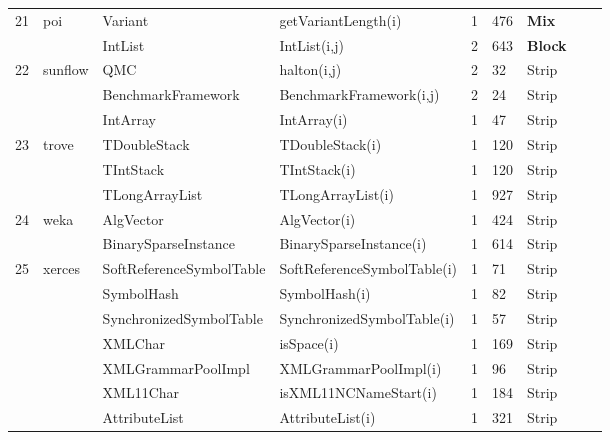 \begin{table}[h]
{\begin{tabular}{|l|l|l|l|l|l|l|l|l|}
21	&	poi			& Variant				& getVariantLength(i)		& 1			& 476	& {\bf Mix}  										\\ 
	&				& IntList					& IntList(i,j)				& 2			& 643	& {\bf Block} 										\\ 	
22	&	sunflow		& QMC					& halton(i,j)				& 2			& 32	& Strip  										\\ 
	&				& BenchmarkFramework	& BenchmarkFramework(i,j) & 2		& 24	& Strip   										\\ 
	&				& IntArray				& IntArray(i)				& 1			& 47	& Strip 										\\ 	
23	&	trove		& TDoubleStack			& TDoubleStack(i)		& 1			& 120	& Strip  										\\ 
	&				& TIntStack				& TIntStack(i)			& 1			& 120	& Strip  										\\ 
	&				& TLongArrayList			& TLongArrayList(i)		& 1			& 927	& Strip  										\\ 
24	&	weka		& AlgVector				& AlgVector(i)			& 1			& 424	& Strip  										\\ 
	&				& BinarySparseInstance	& BinarySparseInstance(i)  & 1			& 614	& Strip 										\\ 
25	&	xerces		& SoftReferenceSymbolTable& SoftReferenceSymbolTable(i) & 1	& 71	& Strip  										\\ 
	&				& SymbolHash			& SymbolHash(i)			& 1			& 82	& Strip 										\\ 
	&				& SynchronizedSymbolTable& SynchronizedSymbolTable(i) & 1	& 57	& Strip  										\\ 
	&				& XMLChar				& isSpace(i)				& 1			& 169	& Strip 										\\ 
	&				& XMLGrammarPoolImpl	& XMLGrammarPoolImpl(i)	& 1			& 96	& Strip   										\\ 
	&				& XML11Char			& isXML11NCNameStart(i)	& 1			& 184	& Strip  										\\ 
	&				& AttributeList			& AttributeList(i)			& 1			& 321	& Strip  										\\ 
\hline
\end{tabular}
}
\bigskip
\label{table:packages}
\end{table}



